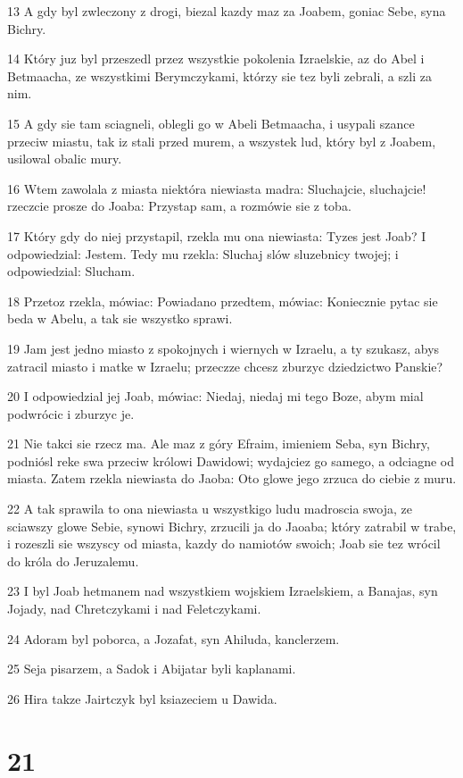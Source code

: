 \par 13 A gdy byl zwleczony z drogi, biezal kazdy maz za Joabem, goniac Sebe, syna Bichry.
\par 14 Który juz byl przeszedl przez wszystkie pokolenia Izraelskie, az do Abel i Betmaacha, ze wszystkimi Berymczykami, którzy sie tez byli zebrali, a szli za nim.
\par 15 A gdy sie tam sciagneli, oblegli go w Abeli Betmaacha, i usypali szance przeciw miastu, tak iz stali przed murem, a wszystek lud, który byl z Joabem, usilowal obalic mury.
\par 16 Wtem zawolala z miasta niektóra niewiasta madra: Sluchajcie, sluchajcie! rzeczcie prosze do Joaba: Przystap sam, a rozmówie sie z toba.
\par 17 Który gdy do niej przystapil, rzekla mu ona niewiasta: Tyzes jest Joab? I odpowiedzial: Jestem. Tedy mu rzekla: Sluchaj slów sluzebnicy twojej; i odpowiedzial: Slucham.
\par 18 Przetoz rzekla, mówiac: Powiadano przedtem, mówiac: Koniecznie pytac sie beda w Abelu, a tak sie wszystko sprawi.
\par 19 Jam jest jedno miasto z spokojnych i wiernych w Izraelu, a ty szukasz, abys zatracil miasto i matke w Izraelu; przeczze chcesz zburzyc dziedzictwo Panskie?
\par 20 I odpowiedzial jej Joab, mówiac: Niedaj, niedaj mi tego Boze, abym mial podwrócic i zburzyc je.
\par 21 Nie takci sie rzecz ma. Ale maz z góry Efraim, imieniem Seba, syn Bichry, podniósl reke swa przeciw królowi Dawidowi; wydajciez go samego, a odciagne od miasta. Zatem rzekla niewiasta do Jaoba: Oto glowe jego zrzuca do ciebie z muru.
\par 22 A tak sprawila to ona niewiasta u wszystkigo ludu madroscia swoja, ze sciawszy glowe Sebie, synowi Bichry, zrzucili ja do Jaoaba; który zatrabil w trabe, i rozeszli sie wszyscy od miasta, kazdy do namiotów swoich; Joab sie tez wrócil do króla do Jeruzalemu.
\par 23 I byl Joab hetmanem nad wszystkiem wojskiem Izraelskiem, a Banajas, syn Jojady, nad Chretczykami i nad Feletczykami.
\par 24 Adoram byl poborca, a Jozafat, syn Ahiluda, kanclerzem.
\par 25 Seja pisarzem, a Sadok i Abijatar byli kaplanami.
\par 26 Hira takze Jairtczyk byl ksiazeciem u Dawida.

\chapter{21}

